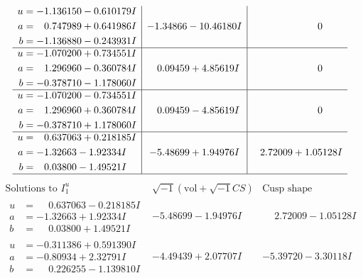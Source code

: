 \documentclass[1p]{elsarticle_modified}
\theoremstyle{definition}
\newcommand{\I}{\sqrt{-1}}
\begin{document}
$$\begin{array}{c|c|c}
\begin{aligned}
u &= -1.136150 - 0.610179 I \\
a &= \phantom{-}0.747989 + 0.641986 I \\
b &= -1.136880 - 0.243931 I\end{aligned}
 & -1.34866 - 10.46180 I & \phantom{-0.000000 } 0 \\ \hline\begin{aligned}
u &= -1.070200 + 0.734551 I \\
a &= \phantom{-}1.296960 - 0.360784 I \\
b &= -0.378710 - 1.178060 I\end{aligned}
 & \phantom{-}0.09459 + 4.85619 I & \phantom{-0.000000 } 0 \\ \hline\begin{aligned}
u &= -1.070200 - 0.734551 I \\
a &= \phantom{-}1.296960 + 0.360784 I \\
b &= -0.378710 + 1.178060 I\end{aligned}
 & \phantom{-}0.09459 - 4.85619 I & \phantom{-0.000000 } 0 \\ \hline\begin{aligned}
u &= \phantom{-}0.637063 + 0.218185 I \\
a &= -1.32663 - 1.92334 I \\
b &= \phantom{-}0.03800 - 1.49521 I\end{aligned}
 & -5.48699 + 1.94976 I & \phantom{-}2.72009 + 1.05128 I\\
 \hline 
 \end{array}$$\newpage$$\begin{array}{c|c|c}  
\text{Solutions to }I^u_{1}& \I (\text{vol} + \sqrt{-1}CS) & \text{Cusp shape}\\
 \hline 
\begin{aligned}
u &= \phantom{-}0.637063 - 0.218185 I \\
a &= -1.32663 + 1.92334 I \\
b &= \phantom{-}0.03800 + 1.49521 I\end{aligned}
 & -5.48699 - 1.94976 I & \phantom{-}2.72009 - 1.05128 I \\ \hline\begin{aligned}
u &= -0.311386 + 0.591390 I \\
a &= -0.80934 + 2.32791 I \\
b &= \phantom{-}0.226255 - 1.139810 I\end{aligned}
 & -4.49439 + 2.07707 I & -5.39720 - 3.30118 I \\ \hline\begin{aligned}

\end{aligned}
\end{array}$$
\end{document}
